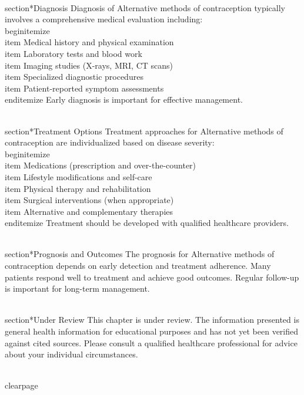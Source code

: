 \\section*{Diagnosis}
Diagnosis of Alternative methods of contraception typically involves a comprehensive medical evaluation including:
\\begin{itemize}
  \\item Medical history and physical examination
  \\item Laboratory tests and blood work
  \\item Imaging studies (X-rays, MRI, CT scans)
  \\item Specialized diagnostic procedures
  \\item Patient-reported symptom assessments
\\end{itemize}
Early diagnosis is important for effective management.

\\section*{Treatment Options}
Treatment approaches for Alternative methods of contraception are individualized based on disease severity:
\\begin{itemize}
  \\item Medications (prescription and over-the-counter)
  \\item Lifestyle modifications and self-care
  \\item Physical therapy and rehabilitation
  \\item Surgical interventions (when appropriate)
  \\item Alternative and complementary therapies
\\end{itemize}
Treatment should be developed with qualified healthcare providers.

\\section*{Prognosis and Outcomes}
The prognosis for Alternative methods of contraception depends on early detection and treatment adherence. Many patients respond well to treatment and achieve good outcomes. Regular follow-up is important for long-term management.

\\section*{Under Review}
This chapter is under review. The information presented is general health information for educational purposes and has not yet been verified against cited sources. Please consult a qualified healthcare professional for advice about your individual circumstances.

\\clearpage
